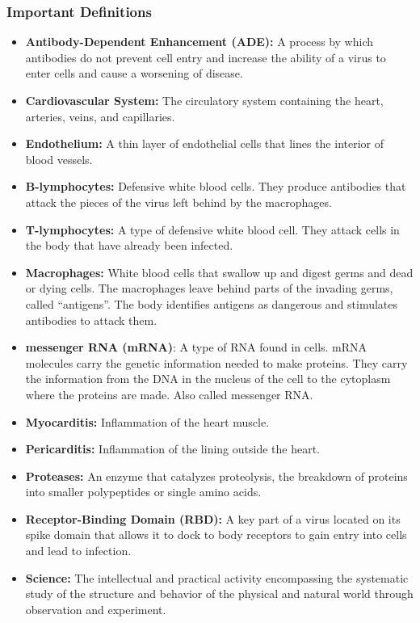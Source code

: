 \documentclass[10pt, a4paper, twocolumn]{book}
\begin{document}
\subsubsection{Important Definitions}
\begin{itemize}
	\item \textbf{Antibody-Dependent Enhancement (ADE):} A process by which antibodies do not prevent cell entry and increase the ability of a virus to enter cells and cause a worsening of disease.
	\item \textbf{Cardiovascular System:} The circulatory system containing the heart, arteries, veins, and capillaries.
	\item \textbf{Endothelium:} A thin layer of endothelial cells that lines the interior of blood vessels.
	\item \textbf{B-lymphocytes:} Defensive white blood cells. They produce antibodies that attack the pieces of the virus left behind by the macrophages.
	\item \textbf{T-lymphocytes:} A type of defensive white blood cell. They attack cells in the body that have already been infected.
	\item \textbf{Macrophages:} White blood cells that swallow up and digest germs and dead or dying cells. The macrophages leave behind parts of the invading germs, called “antigens”. The body identifies antigens as dangerous and stimulates antibodies to attack them.
	\item \textbf{messenger RNA (mRNA)}: A type of RNA found in cells. mRNA molecules carry the genetic information needed to make proteins. They carry the information from the DNA in the nucleus of the cell to the cytoplasm where the proteins are made. Also called messenger RNA.
	\item \textbf{Myocarditis:} Inflammation of the heart muscle.
	\item \textbf{Pericarditis:} Inflammation of the lining outside the heart.
	\item \textbf{Proteases:} An enzyme that catalyzes proteolysis, the breakdown of proteins into smaller polypeptides or single amino acids.
	\item \textbf{Receptor-Binding Domain (RBD):} A key part of a virus located on its spike domain that allows it to dock to body receptors to gain entry into cells and lead to infection.
	\item \textbf{Science:} The intellectual and practical activity encompassing the systematic study of the structure and behavior of the physical and natural world through observation and experiment.
\end{itemize}
\end{document}
